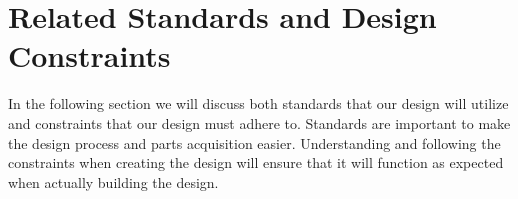 \section{Related Standards and Design Constraints}
In the following section we will discuss both standards that our design will utilize and constraints that our design must adhere to. Standards are important to make the design process and parts acquisition easier. Understanding and following the constraints when creating the design will ensure that it will function as expected when actually building the design.


